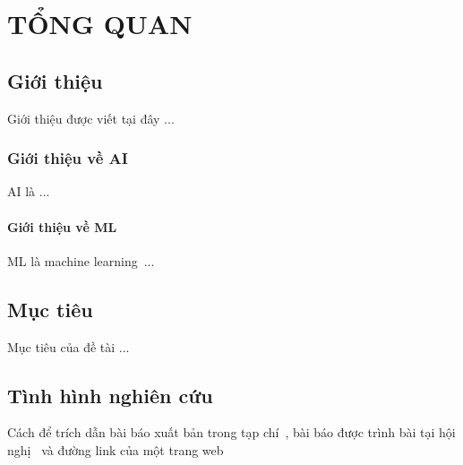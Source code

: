 \chapter{TỔNG QUAN}
\section{Giới thiệu}
Giới thiệu được viết tại đây ... 
\subsection{Giới thiệu về AI}
AI là ... 
\subsubsection{Giới thiệu về ML}
ML là machine learning~\cite{zhu2022}... 
\section{Mục tiêu}
Mục tiêu của đề tài ...

\section{Tình hình nghiên cứu}
Cách để trích dẫn bài báo xuất bản trong tạp chí~\cite{huynhthe2021}, bài báo được trình bài tại hội nghị~\cite{said2014biometric} và đường link của một trang web~~\cite{IoTDesignPro}

